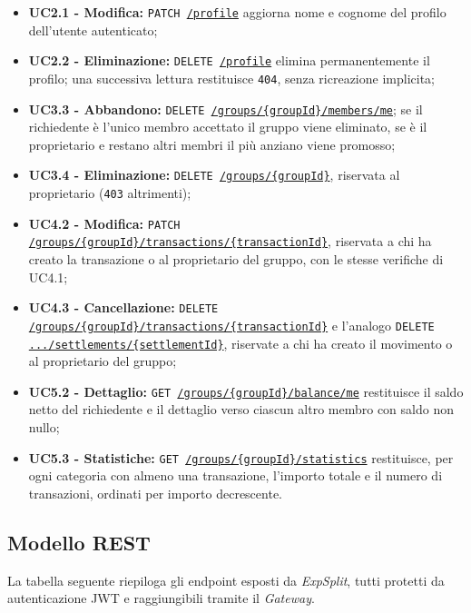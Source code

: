\begin{itemize}
    \item \textbf{UC2.1 - Modifica:} \texttt{PATCH \url{/profile}} aggiorna nome e cognome del profilo dell'utente autenticato;
    \item \textbf{UC2.2 - Eliminazione:} \texttt{DELETE \url{/profile}} elimina permanentemente il profilo; una successiva lettura restituisce \texttt{404}, senza ricreazione implicita;
    \item \textbf{UC3.3 - Abbandono:} \texttt{DELETE \url{/groups/{groupId}/members/me}}; se il richiedente è l'unico membro accettato il gruppo viene eliminato, se è il proprietario e restano altri membri il più anziano viene promosso;
    \item \textbf{UC3.4 - Eliminazione:} \texttt{DELETE \url{/groups/{groupId}}}, riservata al proprietario (\texttt{403} altrimenti);
    \item \textbf{UC4.2 - Modifica:} \texttt{PATCH \url{/groups/{groupId}/transactions/{transactionId}}}, riservata a chi ha creato la transazione o al proprietario del gruppo, con le stesse verifiche di UC4.1;
    \item \textbf{UC4.3 - Cancellazione:} \texttt{DELETE \url{/groups/{groupId}/transactions/{transactionId}}} e l'analogo \texttt{DELETE \url{.../settlements/{settlementId}}}, riservate a chi ha creato il movimento o al proprietario del gruppo;
    \item \textbf{UC5.2 - Dettaglio:} \texttt{GET \url{/groups/{groupId}/balance/me}} restituisce il saldo netto del richiedente e il dettaglio verso ciascun altro membro con saldo non nullo;
    \item \textbf{UC5.3 - Statistiche:} \texttt{GET \url{/groups/{groupId}/statistics}} restituisce, per ogni categoria con almeno una transazione, l'importo totale e il numero di transazioni, ordinati per importo decrescente.
\end{itemize}

\subsection{Modello REST}
La tabella seguente riepiloga gli endpoint esposti da \emph{ExpSplit}, tutti protetti da autenticazione JWT e raggiungibili tramite il \emph{Gateway}.


